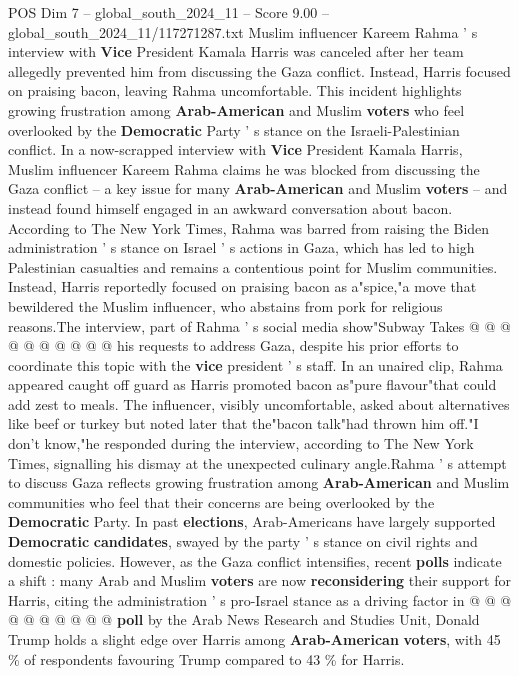 \begin{textsample}{POS Dim 7 – global\_south\_2024\_11 – Score 9.00 – global\_south\_2024\_11/117271287.txt}  \label{ex:f7_pos_146}
Muslim influencer Kareem Rahma ' s interview with \textbf{Vice} President Kamala Harris was canceled after her team allegedly prevented him from discussing the Gaza conflict.
Instead, Harris focused on praising bacon, leaving Rahma uncomfortable.
This incident highlights growing frustration among \textbf{Arab-American} and Muslim \textbf{voters} who feel overlooked by the \textbf{Democratic} Party ' s stance on the Israeli-Palestinian conflict.
In a now-scrapped interview with \textbf{Vice} President Kamala Harris, Muslim influencer Kareem Rahma claims he was blocked from discussing the Gaza conflict -- a key issue for many \textbf{Arab-American} and Muslim \textbf{voters} -- and instead found himself engaged in an awkward conversation about bacon.
According to The New York Times, Rahma was barred from raising the Biden administration ' s stance on Israel ' s actions in Gaza, which has led to high Palestinian casualties and remains a contentious point for Muslim communities.
Instead, Harris reportedly focused on praising bacon as a"spice,"a move that bewildered the Muslim influencer, who abstains from pork for religious reasons.The interview, part of Rahma ' s social media show"Subway Takes @ @ @ @ @ @ @ @ @ @ his requests to address Gaza, despite his prior efforts to coordinate this topic with the \textbf{vice} president ' s staff.
In an unaired clip, Rahma appeared caught off guard as Harris promoted bacon as"pure flavour"that could add zest to meals.
The influencer, visibly uncomfortable, asked about alternatives like beef or turkey but noted later that the"bacon talk"had thrown him off."I don't know,"he responded during the interview, according to The New York Times, signalling his dismay at the unexpected culinary angle.Rahma ' s attempt to discuss Gaza reflects growing frustration among \textbf{Arab-American} and Muslim communities who feel that their concerns are being overlooked by the \textbf{Democratic} Party.
In past \textbf{elections}, Arab-Americans have largely supported \textbf{Democratic} \textbf{candidates}, swayed by the party ' s stance on civil rights and domestic policies.
However, as the Gaza conflict intensifies, recent \textbf{polls} indicate a shift : many Arab and Muslim \textbf{voters} are now \textbf{reconsidering} their support for Harris, citing the administration ' s pro-Israel stance as a driving factor in @ @ @ @ @ @ @ @ @ @ \textbf{poll} by the Arab News Research and Studies Unit, Donald Trump holds a slight edge over Harris among \textbf{Arab-American} \textbf{voters}, with 45 \% of respondents favouring Trump compared to 43 \% for Harris.

\end{textsample}
